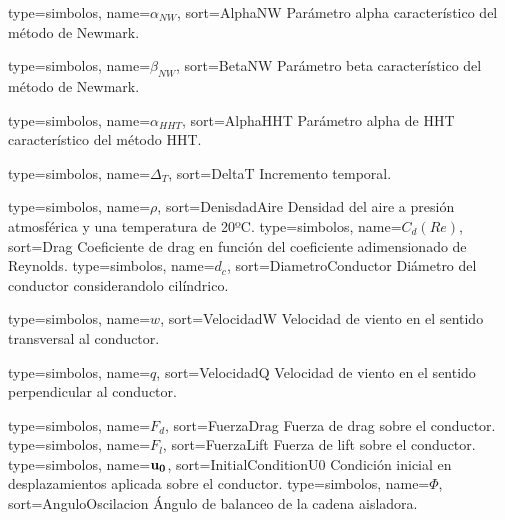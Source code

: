 {
	type={simbolos},
	name={$\alpha_{NW}$}, %
	sort={AlphaNW} %
}
{Parámetro alpha característico del método de Newmark.}

{
	type={simbolos},
	name={$\beta_{NW}$}, %
	sort={BetaNW} %
}
{Parámetro beta característico del método de Newmark.}

{
	type={simbolos},
	name={$\alpha_{HHT}$}, %
	sort={AlphaHHT} %
}
{Parámetro alpha de HHT característico del método HHT.}

{
	type={simbolos},
	name={$\Delta_T$}, %
	sort={DeltaT} %
}
{Incremento temporal.}

{
	type={simbolos},
	name={$\rho$}, %
	sort={DenisdadAire} %
}
{Densidad del aire a presión atmosférica y una temperatura de 20ºC.}
{
	type={simbolos},
	name={$C_d(Re)$}, %
	sort={Drag} %
}
{Coeficiente de drag en función del coeficiente adimensionado de Reynolds.}
{
	type={simbolos},
	name={$d_c$}, %
	sort={DiametroConductor} %
}
{Diámetro del conductor considerandolo cilíndrico.}

{
	type={simbolos},
	name={$w$}, %
	sort={VelocidadW} %
}
{Velocidad de viento en el sentido transversal al conductor.}

{
	type={simbolos},
	name={$q$}, %
	sort={VelocidadQ} %
}
{Velocidad de viento en el sentido perpendicular al conductor.}

{
	type={simbolos},
	name={$F_d$}, %
	sort={FuerzaDrag} %
}
{Fuerza de drag sobre el conductor.}
{
	type={simbolos},
	name={$F_l$}, %
	sort={FuerzaLift} %
}
{Fuerza de lift sobre el conductor.}
{
	type={simbolos},
	name={$\bf{u}_0$}, %
	sort={InitialConditionU0} %
}
{Condición inicial en desplazamientos aplicada sobre el conductor.}
{
	type={simbolos},
	name={$\Phi$}, %
	sort={AnguloOscilacion} %
}
{Ángulo de balanceo de la cadena aisladora.}
